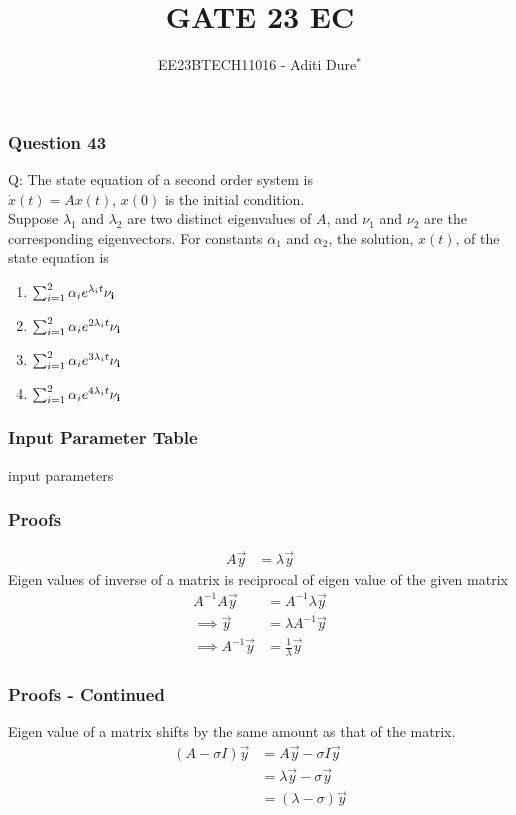 \documentclass{beamer}
\begin{document}
\title{GATE 23 EC }
\author{EE23BTECH11016 - Aditi Dure$^{*}$}
\date{}
\frame{\titlepage}

\begin{frame}
\frametitle{Question 43}
Q: The state equation of a second order system is \\
$ \dot{{x}}(t) = A{x}(t)$, \quad ${x}(0)$ is the initial condition. \\
Suppose $\lambda_1$ and $\lambda_2$ are two distinct eigenvalues of $A$, and $\nu_1$ and $\nu_2$ are the corresponding eigenvectors. For constants $\alpha_1$ and $\alpha_2$, the solution, ${x}(t)$, of the state equation is \\
\begin{enumerate}
\item $\sum_{i=1}^{2} \alpha_ie^{\lambda_it}\bf{\nu}_i$
\item $\sum_{i=1}^{2} \alpha_ie^{2\lambda_it}\bf{\nu}_i$
\item $\sum_{i=1}^{2} \alpha_ie^{3\lambda_it}\bf{\nu}_i$
\item $\sum_{i=1}^{2} \alpha_ie^{4\lambda_it}\bf{\nu}_i$
\end{enumerate}
\end{frame}

\begin{frame}
\frametitle{Input Parameter Table}
\begin{table}[!ht]
    \centering
        
    \caption{input parameters}
    \label{tab:gate23EC43.1}
\end{table}
\end{frame}

\begin{frame}
\frametitle{Proofs}
\begin{align}
A\vec{y} &= \lambda \vec{y} 
\end{align}
Eigen values of inverse of a matrix is reciprocal of eigen value of the given matrix\\
\begin{align}
A^{-1}A\vec{y} &= A^{-1}\lambda \vec{y} \\ \implies
\vec{y} &= \lambda A^{-1}\vec{y}  \\ \implies
A^{-1} \vec{y} &= \frac{1}{\lambda}\vec{y} \label{eq:gate23EC43.1}
\end{align}
\end{frame}


\begin{frame}
\frametitle{Proofs - Continued}
Eigen value of a matrix shifts by the same amount as that of the matrix.\\
\begin{align}
(A - \sigma I)\vec{y} &= A\vec{y} - \sigma I\vec{y} \\
&= \lambda \vec{y} - \sigma \vec{y} \\
&= (\lambda - \sigma) \vec{y} \label{eq:gate23EC43.2}
\end{align}
\end{frame}
\end{document}
